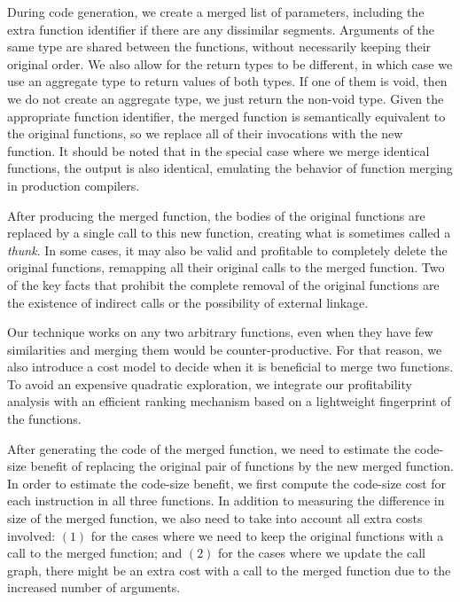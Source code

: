 \documentclass[10pt,twocolumn,nocopyrightspace]{sigplanconf}
\begin{document}
During code generation, we create a merged list of parameters, including the
extra function identifier if there are any dissimilar segments. 
Arguments of the same type are shared between the functions, without necessarily
keeping their original order.
We also allow for the return types to be different, in which case we use an
aggregate type to return values of both types.
If one of them is void, then we do not create an aggregate type, we just return the non-void type.
Given the appropriate function identifier, the merged function is semantically equivalent to the original functions,
so we replace all of their invocations with the new function.
It should be noted that in the special case where we merge identical functions, the output is also identical, emulating
the behavior of function merging in production compilers.

After producing the merged function, the bodies of the original functions are
replaced by a single call to this new function, creating what is sometimes
called a \textit{thunk}.
In some cases, it may also be valid and profitable to completely delete the
original functions, remapping all their original calls to the merged function.  
Two of the key facts that prohibit the complete removal of the original functions
are the existence of indirect calls or the possibility of external linkage.


Our technique works on any two arbitrary functions, even when they have few
similarities and merging them would
be counter-productive. For that reason, we also introduce a cost model to decide
when it is beneficial to merge two functions.
To avoid an expensive quadratic exploration, we integrate our profitability analysis
with an efficient ranking mechanism based on a lightweight fingerprint of the functions.


After generating the code of the merged function, we need to estimate the
code-size benefit of replacing the original pair of functions by the new merged
function.
In order to estimate the code-size benefit, we first compute the code-size cost
for each instruction in all three functions.
In addition to measuring the difference in size of the merged function, we also
need to take into account all extra costs involved:
$(1)$ for the cases where we need to keep the original functions with a call to
the merged function;
and $(2)$ for the cases where we update the call graph, there might be an extra
cost with a call to the merged function due to the increased number of arguments.
 



\end{document}
